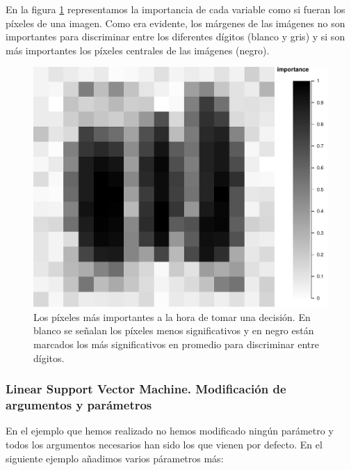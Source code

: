 \documentclass[12pt,spanish,a4paper]{article}
\numberwithin{equation}{section}
\begin{document}
En la figura \ref{fig:varimp_modelo_2_modelo_svmlinear2_paso1}
representamos la importancia de cada variable como si fueran los píxeles
de una imagen. Como era evidente, los márgenes de las imágenes no son
importantes para discriminar entre los diferentes dígitos (blanco y
gris) y si son más importantes los píxeles centrales de las imágenes
(negro).

\begin{figure}[h]

{\centering \includegraphics[width=0.8\linewidth]{graphics/svm/varimp_modelo_2_modelo_svmlinear2_paso1-1} 

}

\caption{Los píxeles más importantes a la hora de tomar una decisión. En blanco se señalan los píxeles menos significativos y en negro están marcados los más significativos en promedio para discriminar entre dígitos.}\label{fig:varimp_modelo_2_modelo_svmlinear2_paso1}
\end{figure}

\clearpage
\newpage

\hypertarget{linear-support-vector-machine.-modificacion-de-argumentos-y-parametros}{%
\subsubsection{Linear Support Vector Machine. Modificación de argumentos
y
parámetros}\label{linear-support-vector-machine.-modificacion-de-argumentos-y-parametros}}

En el ejemplo que hemos realizado no hemos modificado ningún parámetro y
todos los argumentos necesarios han sido los que vienen por defecto. En
el siguiente ejemplo añadimos varios párametros más:
\end{document}
